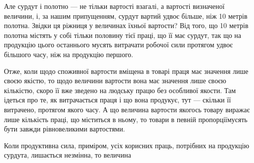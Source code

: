 Але сурдут і полотно — не тільки вартості взагалі, а вартості
визначеної величини, і, за нашим припущенням, сурдут вартий
удвоє більше, ніж 10 метрів полотна. Звідки ця ріжниця у величинах
їхньої вартости? Від того, що 10 метрів полотна містять у
собі тільки половину тієї праці, що її має сурдут, так що на продукцію
цього останнього мусять витрачати робочої сили протягом
удвоє більшого часу, ніж на продукцію першого.

Отже, коли щодо споживної вартости вміщена в товарі праця
має значення лише своєю якістю, то щодо величини вартости вона
має значення лише своєю кількістю, скоро її вже зведено на людську
працю без особливої якости. Там ідеться про те, як витрачається
праця і що вона продукує, тут — скільки її витрачено,
протягом якого часу. А що величина вартости якогось товару
виражає лише кількість праці, що міститься в ньому, то товари
в певній пропорціїмусять бути завжди рівновеликими вартостями.

Коли продуктивна сила, приміром, усіх корисних праць, потрібних
на продукцію сурдута, лишається незмінна, то величина
\parbreak{}  %
